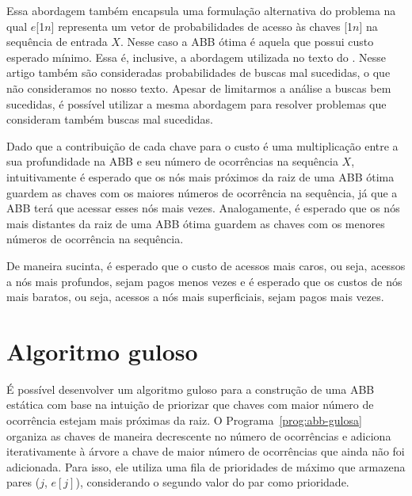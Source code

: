 Essa abordagem também encapsula uma formulação alternativa do problema na qual $e$[1\tdots$n$] representa um vetor de probabilidades de acesso às chaves [1\tdots$n$] na sequência de entrada $X$. Nesse caso a ABB ótima é aquela que possui custo esperado mínimo. Essa é, inclusive, a abordagem utilizada no texto do \cite{knuth}. Nesse artigo também são consideradas probabilidades de buscas mal sucedidas, o que não consideramos no nosso texto. Apesar de limitarmos a análise a buscas bem sucedidas, é possível utilizar a mesma abordagem para resolver problemas que consideram também buscas mal sucedidas.

Dado que a contribuição de cada chave para o custo é uma multiplicação entre a sua profundidade na ABB e seu número de ocorrências na sequência $X$, intuitivamente é esperado que os nós mais próximos da raiz de uma ABB ótima guardem as chaves com os maiores números de ocorrência na sequência, já que a ABB terá que acessar esses nós mais vezes. Analogamente, é esperado que os nós mais distantes da raiz de uma ABB ótima guardem as chaves com os menores números de ocorrência na sequência.

De maneira sucinta, é esperado que o custo de acessos mais caros, ou seja, acessos a nós mais profundos, sejam pagos menos vezes e é esperado que os custos de nós mais baratos, ou seja, acessos a nós mais superficiais, sejam pagos mais vezes.

\section{Algoritmo guloso}

É possível desenvolver um algoritmo guloso para a construção de uma ABB estática com base na intuição de priorizar que chaves com maior número de ocorrência estejam mais próximas da raiz. O Programa~\ref{prog:abb-gulosa} organiza as chaves de maneira decrescente no número de ocorrências e adiciona iterativamente à árvore a chave de maior número de ocorrências que ainda não foi adicionada. Para isso, ele utiliza uma fila de prioridades de máximo que armazena pares ($j$, $e[j]$), considerando o segundo valor do par como prioridade.

